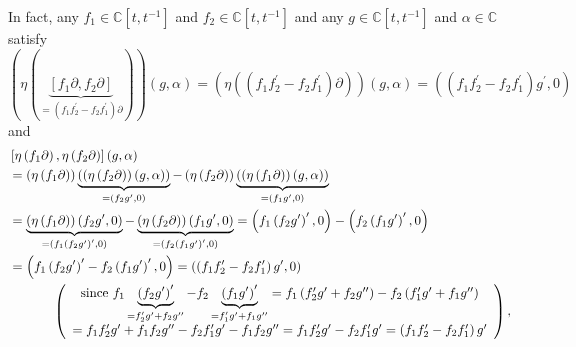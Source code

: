 \documentclass[etingof-lie.tex]{subfiles}
\begin{document}
In fact, any $f_{1}\in\mathbb{C}\left[  t,t^{-1}\right]  $ and $f_{2}%
\in\mathbb{C}\left[  t,t^{-1}\right]  $ and any $g\in\mathbb{C}\left[
t,t^{-1}\right]  $ and $\alpha\in\mathbb{C}$ satisfy%
\[
\left(  \eta\left(  \underbrace{\left[  f_{1}\partial,f_{2}\partial\right]
}_{=\left(  f_{1}f_{2}^{\prime}-f_{2}f_{1}^{\prime}\right)  \partial}\right)
\right)  \left(  g,\alpha\right)  =\left(  \eta\left(  \left(  f_{1}%
f_{2}^{\prime}-f_{2}f_{1}^{\prime}\right)  \partial\right)  \right)  \left(
g,\alpha\right)  =\left(  \left(  f_{1}f_{2}^{\prime}-f_{2}f_{1}^{\prime
}\right)  g^{\prime},0\right)
\]
and%
\begin{align*}
&  \left[  \eta\left(  f_{1}\partial\right)  ,\eta\left(  f_{2}\partial
\right)  \right]  \left(  g,\alpha\right) \\
&  =\left(  \eta\left(  f_{1}\partial\right)  \right)  \underbrace{\left(
\left(  \eta\left(  f_{2}\partial\right)  \right)  \left(  g,\alpha\right)
\right)  }_{=\left(  f_{2}g^{\prime},0\right)  }-\left(  \eta\left(
f_{2}\partial\right)  \right)  \underbrace{\left(  \left(  \eta\left(
f_{1}\partial\right)  \right)  \left(  g,\alpha\right)  \right)  }_{=\left(
f_{1}g^{\prime},0\right)  }\\
&  =\underbrace{\left(  \eta\left(  f_{1}\partial\right)  \right)  \left(
f_{2}g^{\prime},0\right)  }_{=\left(  f_{1}\left(  f_{2}g^{\prime}\right)
^{\prime},0\right)  }-\underbrace{\left(  \eta\left(  f_{2}\partial\right)
\right)  \left(  f_{1}g^{\prime},0\right)  }_{=\left(  f_{2}\left(
f_{1}g^{\prime}\right)  ^{\prime},0\right)  }=\left(  f_{1}\left(
f_{2}g^{\prime}\right)  ^{\prime},0\right)  -\left(  f_{2}\left(
f_{1}g^{\prime}\right)  ^{\prime},0\right) \\
&  =\left(  f_{1}\left(  f_{2}g^{\prime}\right)  ^{\prime}-f_{2}\left(
f_{1}g^{\prime}\right)  ^{\prime},0\right)  =\left(  \left(  f_{1}%
f_{2}^{\prime}-f_{2}f_{1}^{\prime}\right)  g^{\prime},0\right) \\
&  \ \ \ \ \ \ \ \ \ \ \left(
\begin{array}
[c]{c}%
\text{since }f_{1}\underbrace{\left(  f_{2}g^{\prime}\right)  ^{\prime}%
}_{=f_{2}^{\prime}g^{\prime}+f_{2}g^{\prime\prime}}-f_{2}\underbrace{\left(
f_{1}g^{\prime}\right)  ^{\prime}}_{=f_{1}^{\prime}g^{\prime}+f_{1}%
g^{\prime\prime}}=f_{1}\left(  f_{2}^{\prime}g^{\prime}+f_{2}g^{\prime\prime
}\right)  -f_{2}\left(  f_{1}^{\prime}g^{\prime}+f_{1}g^{\prime\prime}\right)
\\
=f_{1}f_{2}^{\prime}g^{\prime}+f_{1}f_{2}g^{\prime\prime}-f_{2}f_{1}^{\prime
}g^{\prime}-f_{1}f_{2}g^{\prime\prime}=f_{1}f_{2}^{\prime}g^{\prime}%
-f_{2}f_{1}^{\prime}g^{\prime}=\left(  f_{1}f_{2}^{\prime}-f_{2}f_{1}^{\prime
}\right)  g^{\prime}%
\end{array}
\right)  ,
\end{align*}
\end{document}
